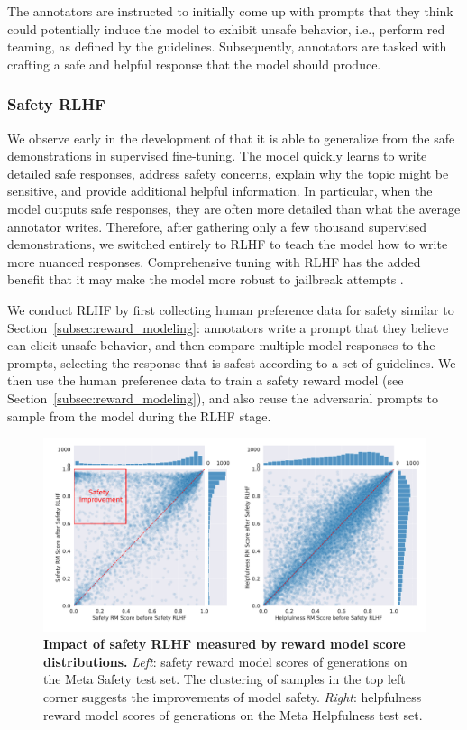 The annotators are instructed to initially come up with prompts that they think could potentially induce the model to exhibit unsafe behavior, i.e., perform red teaming, as defined by the guidelines. Subsequently, annotators are tasked with crafting a safe and helpful response that the model should produce.


\subsubsection{Safety RLHF} \label{subsec:safety_rlhf}
We observe early in the development of \modelname that it is able to generalize from the safe demonstrations in supervised fine-tuning. The model quickly learns to write detailed safe responses, address safety concerns, explain why the topic might be sensitive, and provide additional helpful information.
In particular, when the model outputs safe responses, they are often more detailed than what the average annotator writes. Therefore, after gathering only a few thousand supervised demonstrations, we switched
entirely to RLHF to teach the model how to write more nuanced responses.
Comprehensive tuning with RLHF has the added benefit that it may make the model more robust to jailbreak attempts \citep{bai2022training}.

We conduct RLHF by first collecting human preference data for safety similar to Section~\ref{subsec:reward_modeling}: annotators write a prompt that they believe can elicit unsafe behavior, and then compare multiple model responses to the prompts, selecting the response that is safest according to a set of guidelines.
We then use the human preference data to train a safety reward model (see Section~\ref{subsec:reward_modeling}), and also reuse the adversarial prompts to sample from the model during the RLHF stage.

\begin{figure}[!htbp]
    \centering
    \includegraphics[width=1\linewidth]{img/safety_scaling/safety_rlhf_impact.pdf}
    \caption{\textbf{Impact of safety RLHF measured by reward model score distributions.} \textit{Left}: safety reward model scores of generations on the Meta Safety test set. The clustering of samples in the top left corner suggests the improvements of model safety. \textit{Right}: helpfulness reward model scores of generations on the Meta Helpfulness test set.}
    \label{fig:impact_of_safety_rlhf}
\end{figure}

